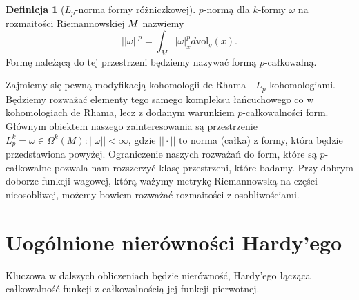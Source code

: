 \documentclass[licencjacka]{pracamgr}
\theoremstyle{definition}
\newtheorem{definition}{Definicja}[section]
\theoremstyle{definition}
\theoremstyle{plain}
\theoremstyle{plain}
\theoremstyle{plain}
\theoremstyle{plain}
\def\M{\ensuremath M}
\begin{document}
\begin{definition}[$L_p$-norma formy różniczkowej]
$p$-normą dla $k$-formy $\omega$ na rozmaitości Riemannowskiej $\M$ nazwiemy
\begin{equation} \label{big-norm}
  || \omega ||^p =  \int_M |\omega|_x^p d \text{vol}_g(x).
\end{equation}
Formę należącą do tej przestrzeni będziemy nazywać formą $p$-całkowalną.
\end{definition}

Zajmiemy się pewną modyfikacją kohomologii de Rhama -
$L_p$-kohomologiami.  Będziemy rozważać elementy tego samego kompleksu
łańcuchowego co w kohomologiach de Rhama, lecz z dodanym warunkiem
$p$-całkowalności form. Głównym obiektem naszego zainteresowania są
przestrzenie 
$L_p^k = {\omega \in \Omega^k(M): ||\omega|| <\infty}$, gdzie $|| \cdot ||$
to norma (całka) z formy, która będzie przedstawiona powyżej. 
Ograniczenie
naszych rozważań do form, które są $p$-całkowalne pozwala nam rozszerzyć
klasę przestrzeni, które badamy. Przy dobrym doborze funkcji wagowej, którą
ważymy metrykę Riemannowską na części nieosobliwej, możemy
bowiem rozważać rozmaitości z osobliwościami.\\








\section{Uogólnione nierówności Hardy'ego}
Kluczowa w dalszych obliczeniach będzie nierówność, Hardy'ego łącząca całkowalność
funkcji z całkowalnością jej funkcji pierwotnej.
\end{document}
